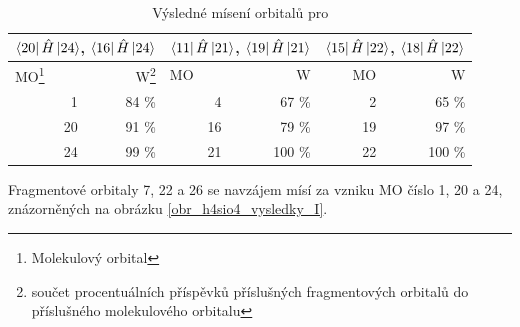\documentclass[
  digital, %
  table,   %
  lof,     %
  lot,     %
]{fithesis3}
\begin{document}
 
 
\begin{table}[htbp]
\begin{minipage}{\textwidth}
\caption{Výsledné mísení orbitalů pro }
\begin{center}
\begin{tabular}{|r|r|r|r|r|r|}
\hline 
\multicolumn{2}{|c|}{$\bra{20}{\hat{H}}\ket{24}$, $\bra{16}{\hat{H}}\ket{24}$} & \multicolumn{2}{|c|}{$\bra{11}{\hat{H}}\ket{21}$, $\bra{19}{\hat{H}}\ket{21}$}& \multicolumn{2}{|c|}{$\bra{15}{\hat{H}}\ket{22}$, $\bra{18}{\hat{H}}\ket{22}$} \\
\hline \hline
\multicolumn{1}{|l|}{MO\footnote{Molekulový orbital} } & \multicolumn{1}{r|}{W\footnote{součet procentuálních příspěvků příslušných fragmentových orbitalů do příslušného molekulového orbitalu}} & \multicolumn{1}{l|}{MO} & \multicolumn{1}{r|}{W} & MO & \multicolumn{1}{r|}{W} \\ \hline
1 & 84 \% & 4 & 67 \% & 2 & 65 \% \\ \hline
20 & 91 \% & 16 & 79 \% & 19 &  97 \% \\ \hline
24 & 99 \% & 21 & 100 \% &  22& 100 \% \\ \hline
\end{tabular}
\end{center}
\label{tab_h4sio4_vysledky}
\end{minipage}
\end{table}
    Fragmentové orbitaly 7, 22 a 26 se navzájem mísí za vzniku MO číslo 1, 20 a 24, znázorněných na obrázku \ref{obr_h4sio4_vysledky_I}.
\end{document}
